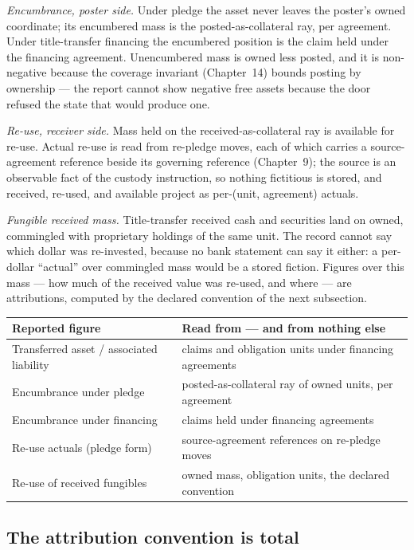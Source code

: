 \emph{Encumbrance, poster side.} Under pledge the asset never leaves the
poster's owned coordinate; its encumbered mass is the posted-as-collateral ray,
per agreement. Under title-transfer financing the encumbered position is the
claim held under the financing agreement. Unencumbered mass is owned less
posted, and it is non-negative because the coverage invariant (Chapter~14)
bounds posting by ownership --- the report cannot show negative free assets
because the door refused the state that would produce one.

\emph{Re-use, receiver side.} Mass held on the received-as-collateral ray is
available for re-use. Actual re-use is read from re-pledge moves, each of which
carries a source-agreement reference beside its governing reference
(Chapter~9); the source is an observable fact of the custody instruction, so
nothing fictitious is stored, and received, re-used, and available project as
per-(unit, agreement) actuals.

\emph{Fungible received mass.} Title-transfer received cash and securities land
on owned, commingled with proprietary holdings of the same unit. The record
cannot say which dollar was re-invested, because no bank statement can say it
either: a per-dollar ``actual'' over commingled mass would be a stored fiction.
Figures over this mass --- how much of the received value was re-used, and where
--- are attributions, computed by the declared convention of the next
subsection.

\begin{center}
\begin{tabular}{@{}ll@{}}
\toprule
Reported figure & Read from --- and from nothing else \\
\midrule
Transferred asset / associated liability & claims and obligation units under financing agreements \\
Encumbrance under pledge & posted-as-collateral ray of owned units, per agreement \\
Encumbrance under financing & claims held under financing agreements \\
Re-use actuals (pledge form) & source-agreement references on re-pledge moves \\
Re-use of received fungibles & owned mass, obligation units, the declared convention \\
\bottomrule
\end{tabular}
\end{center}

\subsection{The attribution convention is total}

